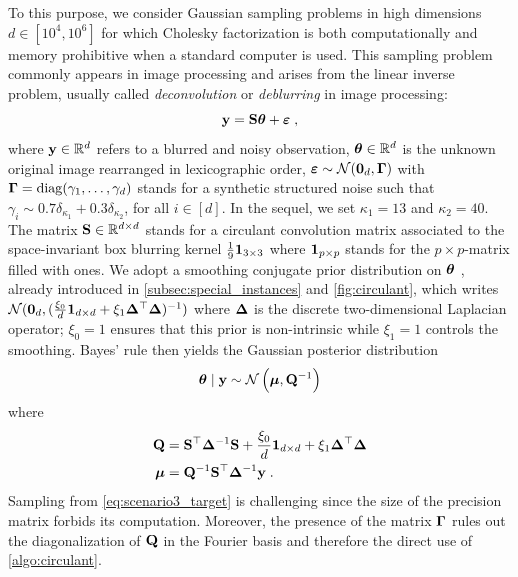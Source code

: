 \documentclass[nohypdvips,onefignum,onetabnum]{siamart171218}
\begin{document}
To this purpose, we consider Gaussian sampling problems in high dimensions $d \in [10^4,10^6]$ for which Cholesky factorization is both computationally and memory prohibitive when a standard computer is used.
This sampling problem commonly appears in image processing \cite{Giovannelli2015,Orieux2010,Marnissi2018,Vono2019} and arises from the linear inverse problem, usually called {\em deconvolution} or {\em deblurring} in image processing:
\begin{equation}
  \mathbf{y} = \mathbf{S}\boldsymbol{\theta} + \boldsymbol{\varepsilon}\;,
\end{equation}
where $\mathbf{y} \in \mathbb{R}^d$ refers to a blurred and noisy observation, $\boldsymbol{\theta} \in \mathbb{R}^d$ is the unknown original image rearranged in lexicographic order, $\boldsymbol{\varepsilon} \sim \mathcal{N}(\mathbf{0}_d,\mathbf{\Gamma})$ with $\mathbf{\Gamma} = \mathrm{diag}(\gamma_1,\hdots,\gamma_d)$ stands for a synthetic structured noise such that $\gamma_i \sim 0.7\delta_{\kappa_1} + 0.3\delta_{\kappa_2}$, for all $i \in [d]$.
In the sequel, we set $\kappa_1 = 13$ and $\kappa_2 = 40$.
The matrix $\mathbf{S} \in \mathbb{R}^{d \times d}$ stands for a circulant convolution matrix associated to the space-invariant box blurring kernel $\frac{1}{9}\mathbf{1}_{3 \times 3}$ where $\mathbf{1}_{p \times p}$ stands for the $p \times p$-matrix filled with ones.
We adopt a smoothing conjugate prior distribution on $\boldsymbol{\theta}$ \cite{Molina1989,Molina2006,Likas2004}, already introduced in \cref{subsec:special_instances} and \cref{fig:circulant}, which writes $\mathcal{N}(\mathbf{0}_d, (\frac{\xi_0}{d}\mathbf{1}_{d \times d} +  \xi_1\mathbf{\Delta}^{\top}\mathbf{\Delta})^{-1})$ where $\mathbf{\Delta}$ is the discrete two-dimensional Laplacian operator; $\xi_0 = 1$ ensures that this prior is non-intrinsic while $\xi_1 = 1$ controls the smoothing.
Bayes' rule then yields the Gaussian posterior distribution
\begin{equation}
  \Bs{\theta} \mid \B{y} \sim \mathcal{N}\pr{\Bs{\mu},\B{Q}^{-1}} \label{eq:scenario3_target}
\end{equation}
where
\begin{align}
  \B{Q} &= \B{S}^{\top}\B{\Delta}^{-1}\B{S} + \dfrac{\xi_0}{d}\B{1}_{d \times d} + \xi_1\B{\Delta}^{\top}\B{\Delta} \label{eq:scenario3_Q}\\
  \Bs{\mu} &= \B{Q}^{-1}\B{S}^{\top}\B{\Delta}^{-1}\B{y}\eqsp.
\end{align}
Sampling from \cref{eq:scenario3_target} is challenging since the size of the precision matrix forbids its computation. Moreover, the presence of the matrix $\mathbf{\Gamma}$ rules out the diagonalization of $\mathbf{Q}$ in the Fourier basis and therefore the direct use of \cref{algo:circulant}.
\end{document}

